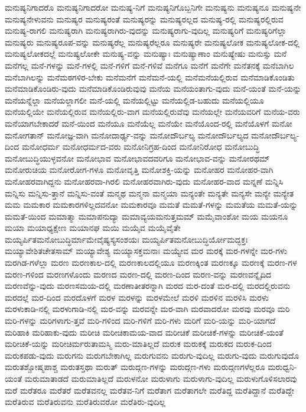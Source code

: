 {ಮನುಷ್ಯನಿಗಾದರೊ
ಮನುಷ್ಯನಿಗಾದರೋ
ಮನುಷ್ಯ-ನಿಗೆ
ಮನುಷ್ಯನಿಗೊಬ್ಬನಿಗೇ
ಮನುಷ್ಯನು
ಮನುಷ್ಯನೂ
ಮನುಷ್ಯನೇ
ಮನುಷ್ಯನೇಳುವನು
ಮನುಷ್ಯರ
ಮನುಷ್ಯರಂತೆ
ಮನುಷ್ಯರನ್ನು
ಮನುಷ್ಯರಲ್ಲದ
ಮನುಷ್ಯ-ರಲ್ಲಿ
ಮನುಷ್ಯರಲ್ಲಿರುವ
ಮನುಷ್ಯ-ರಾಗಲಿ
ಮನುಷ್ಯರಾಗಿ
ಮನುಷ್ಯರಾಗಿರು-ವುದನ್ನು
ಮನುಷ್ಯರಾಗು-ವುದಿಲ್ಲ
ಮನುಷ್ಯರಿಗೆ
ಮನುಷ್ಯರಿಗೆಲ್ಲಾ
ಮನುಷ್ಯರು
ಮನುಷ್ಯರೂಪ-ವನ್ನು
ಮನುಷ್ಯರೆಲ್ಲ
ಮನುಷ್ಯರೆಲ್ಲರೂ
ಮನುಷ್ಯರೇ
ಮನುಷ್ಯಲೋಕ
ಮನುಷ್ಯಲೋಕ-ದಲ್ಲಿ
ಮನುಷ್ಯಲೋಕದಲ್ಲೆ
ಮನುಷ್ಯಲೋಕೇ
ಮನುಷ್ಯ-ವನ್ನು
ಮನುಷ್ಯಾಃ
ಮನುಷ್ಯಾಣಾಂ
ಮನುಷ್ಯೇಷು
ಮನುಸ್ಸು
ಮನೆ
ಮನೆಗಲ್ಲ
ಮನೆ-ಗಳನ್ನು
ಮನೆ-ಗಳಲ್ಲಿ
ಮನೆ-ಗಳಿಗೆ
ಮನೆ-ಗಳಿವೆ
ಮನೆಗೂ
ಮನೆಗೆ
ಮನೆಗೇ
ಮನೆತನಕ್ಕೆ
ಮನೆಬಾಗಿಲ
ಮನೆಬಾಗಿಲನ್ನು
ಮನೆಮಠಗಳಿರ-ಬೇಕು
ಮನೆಮನೆಗೆ
ಮನೆಮನೆ-ಯಲ್ಲಿ
ಮನೆಮನೆಯಲ್ಲಿರುವ
ಮನೆಮಾಡಿಕೊಂಡಿತು
ಮನೆಮಾಡಿಕೊಂಡಿರು-ವುದು
ಮನೆಮಾಡಿಕೊಂಡಿರುವುವು
ಮನೆಯ
ಮನೆಯಂತಾಗು-ವುದು
ಮನೆ-ಯಂತೆ
ಮನೆ-ಯನ್ನು
ಮನೆಯನ್ನೆಲ್ಲಾ
ಮನೆಯಲ್ಲಾಗಲೀ
ಮನೆ-ಯಲ್ಲಿ
ಮನೆಯಲ್ಲಿಟ್ಟು
ಮನೆಯಲ್ಲಿಡ-ಬಹುದು
ಮನೆಯಲ್ಲಿಯೂ
ಮನೆಯಲ್ಲಿಯೇ
ಮನೆಯಲ್ಲಿರುವ
ಮನೆಯಲ್ಲಿರು-ವಾಗ
ಮನೆಯಲ್ಲಿರುವೆವು
ಮನೆಯಲ್ಲೇ
ಮನೆಯವರಿಗೆ
ಮನೆಯ-ವರು
ಮನೆಯಾಗಬೇಕಾದರೆ
ಮನೆ-ಯಿಂದ
ಮನೆಯೂ
ಮನೆಯೆಲ್ಲ
ಮನೆಯೇ
ಮನೆಯೊಂದ-ರಲ್ಲಿ
ಮನೆಯೊಳಗೆ
ಮನೋ
ಮನೋಗತಾನ್
ಮನೋಜ್ಞ-ವಾಗಿ
ಮನೋದಾರ್ಢ್ಯ-ವನ್ನು
ಮನೋದೌರ್ಬಲ್ಯ
ಮನೋದೌರ್ಬಲ್ಯದ
ಮನೋದೌರ್ಬಲ್ಯ-ದಿಂದ
ಮನೋಧರ್ಮ
ಮನೋಧರ್ಮದ-ವರು
ಮನೋನಿಗ್ರಹ-ದಿಂದ
ಮನೋನಿರೋಧ
ಮನೋಬುದ್ಧಿ
ಮನೋಬುದ್ಧಿಯುಳ್ಳವನೋ
ಮನೋಭಾವ
ಮನೋಭಾವದವರಿಗೂ
ಮನೋಭಾವ-ವನ್ನು
ಮನೋರಥಮ್
ಮನೋರುಚಿಯ
ಮನೋರೋಗ-ಗಳೂ
ಮನೋವೃತ್ತಿ
ಮನೋಶಕ್ತಿ-ಯನ್ನು
ಮನೋಹರ
ಮನೋಹರ-ವಾಗಿ
ಮನೋಹರವಾಗಿದ್ದನು
ಮನೋಹರವಾ-ಗಿರಲಿ
ಮನೋಹರವಾಗಿರು-ವುದು
ಮನೋಹರ-ವಾದ
ಮನ್ನಣೆ
ಮನ್ನಿಸಿ
ಮನ್ನಿಸು
ಮನ್ನಿಸು-ತ್ತಾನೆ
ಮನ್ನಿಸು-ವಂತೆ
ಮನ್ಮಥ
ಮನ್ಮನಾ
ಮನ್ಮಯಾ
ಮನ್ಯಂತೇ
ಮನ್ಯತೇ
ಮನ್ಯಸೇ
ಮನ್ಯೇ
ಮನ್ಯೇತ
ಮಮ
ಮಮಕಾರ
ಮಮಕಾರಗಳಿಲ್ಲದವನೋ
ಮಮಕಾರವೂ
ಮಮತೆ
ಮಮತೆ-ಗಳನ್ನು
ಮಮತೆಯ
ಮಮತೆ-ಯನ್ನು
ಮಮತೆ-ಯಿಂದ
ಮಮಾತ್ಮಾ
ಮಮಾಪನುದ್ಯಾ
ಮಮಾವ್ಯಯಮನುತ್ತಮಮ್
ಮಮೈವಾಂಶೋ
ಮಯ
ಮಯನೂ
ಮಯಾ
ಮಯಾಧ್ಯಕ್ಷೇಣ
ಮಯಾನಘ
ಮಯಿ
ಮಯೈವ
ಮಯೈವೈತೇ
ಮಯ್ಯರ್ಪಿತಮನೋಬುದ್ಧಿರ್ಮಾಮೇವೈಷ್ಯಸ್ಯಸಂಶಯಃ
ಮಯ್ಯರ್ಪಿತಮನೋಬುದ್ಧಿರ್ಯೋಮದ್ಭಕ್ತಃ
ಮಯ್ಯಾವೇಶಿತಚೇತಸಾಮ್
ಮಯ್ಯಾವೇಶ್ಯ
ಮಯ್ಯಾಸಕ್ತಮನಾಃ
ಮಯ್ಯೇವ
ಮರ
ಮರಕ್ಕೆ
ಮರ-ಗಳನ್ನೇ
ಮರ-ಗಳು
ಮರಗಿಡ-ಗಳೆಲ್ಲಾ
ಮರಣ
ಮರಣಕಾಲ-ದಲ್ಲಿ
ಮರಣಕಾಲದಲ್ಲಿಯೂ
ಮರಣಕ್ಕಿಂತ
ಮರಣಕ್ಕೂ
ಮರಣಕ್ಕೆ
ಮರಣ-ಗಳ
ಮರಣ-ಗಳಿಂದ
ಮರಣಗಳೊಂದು
ಮರಣದ
ಮರಣ-ದಲ್ಲಿ
ಮರಣ-ದಿಂದ
ಮರಣ-ವನ್ನು
ಮರಣವನ್ನೈದಿದ
ಮರಣವೆನ್ನು-ವುದು
ಮರಣಸಮಯ-ದಲ್ಲಿ
ಮರಣಾತೀತರನ್ನಾಗಿ
ಮರದ
ಮರ-ದಂತೆ
ಮರ-ದಲ್ಲಿ
ಮರದಲ್ಲಿರುವನು
ಮರದಲ್ಲೆ
ಮರ-ದಿಂದ
ಮರದೊಳಗೆ
ಮರಳ
ಮರಳನ್ನು
ಮರಳಮೇಲೆ
ಮರಳಿ
ಮರಳಿನ
ಮರಳಿಸಿ
ಮರಳು
ಮರಳುಕಾಡಿ-ನಲ್ಲಿ
ಮರಳುಗಾಡಿ-ನಲ್ಲಿ
ಮರ-ವನ್ನು
ಮರವನ್ನೇ
ಮರ-ವಾಗಿ
ಮರವಾದರೋ
ಮರವು
ಮರವೂ
ಮರಿ
ಮರಿ-ಗಳನ್ನು
ಮರಿಗಳಾಗು-ತ್ತವೆ
ಮರಿ-ಗಳಿಂದ
ಮರಿ-ಗಳಿಗೆ
ಮರಿ-ಗಳು
ಮರಿಗೆ
ಮರಿ-ಯನ್ನು
ಮರಿ-ಯಾಗದೆ
ಮರಿಹಾಕಿ
ಮರಿಹಾಕು-ವುದು
ಮರೀಚಿ
ಮರೀಚಿಕಾಮಯ-ವಾದ
ಮರೀಚಿಕೆ
ಮರೀಚಿಕೆ-ಗಳನ್ನು
ಮರೀಚಿಕೆ-ಯಂತೆ
ಮರೀಚಿಕೆ-ಯನ್ನು
ಮರೀಚಿರ್ಮರುತಾಮಸ್ಮಿ
ಮರು-ಮಾತಿಲ್ಲದೆ
ಮರುಕ
ಮರುಕಕ್ಕೆ
ಮರುಕದ
ಮರುಕ-ದಿಂದ
ಮರುಕಪಡು-ವುದು
ಮರುಗನು
ಮರುಗಬೇಕಾಗಿಲ್ಲ
ಮರುಗುವನು
ಮರುಗು-ವುದಿಲ್ಲ
ಮರುಗು-ವುದು
ಮರುಗುವುದೊ
ಮರುತಶ್ಚೋಷ್ಮಪಾಶ್ಚ
ಮರುತಸ್ತಥಾ
ಮರುತ್
ಮರುದ್ಗಣ-ಗಳನ್ನು
ಮರುದ್ಗಣ-ಗಳು
ಮರುದ್ಗಣಗಳೆಲ್ಲರೂ
ಮರುಧ್ವನಿ-ಯಂತೆ
ಮರುಮಾತಾಡದೆ
ಮರುಮಾತಿಲ್ಲದೆ
ಮರುಳನೋ
ಮರುಳಾಗು
ಮರುಳಾಗು-ವುದಿಲ್ಲ
ಮರುಳುಗೊಳಿಸಲಾರವು
ಮರೆ
ಮರೆತರೂ
ಮರೆತರೆ
ಮರೆತವನಲ್ಲ
ಮರೆತವ-ನಿಗೆ
ಮರೆತಾಗ
ಮರೆತಾಗಲೇ
ಮರೆತಿದ್ದ
ಮರೆತಿದ್ದಾನೆ
ಮರೆತಿದ್ದೇ
ಮರೆತಿರುವ
ಮರೆತಿರುವನು
ಮರೆತಿರುವರೋ
ಮರೆತಿರು-ವುದಿಲ್ಲ
}
